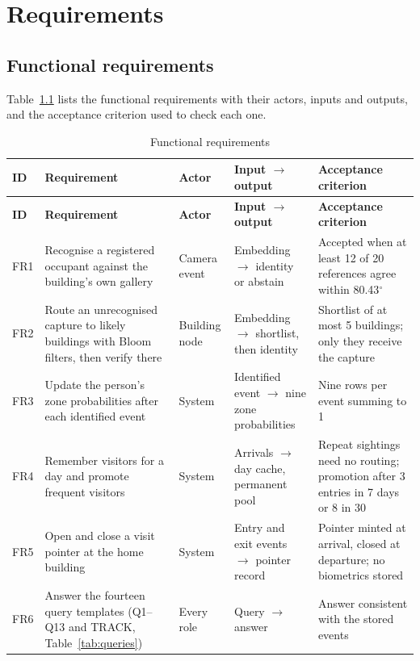 \documentclass[12pt,a4paper,oneside]{report}
\begin{document}
\clearpage
\chapter{Requirements}
\section{Functional requirements}
Table~\ref{tab:fr} lists the functional requirements with their actors, inputs and outputs, and the acceptance criterion used to check each one.

{\small\setlength{\tabcolsep}{4pt}\renewcommand{\arraystretch}{1.2}
\begin{longtable}{|p{0.93cm}|p{3.75cm}|p{1.87cm}|p{3.19cm}|p{3.94cm}|}
\caption{Functional requirements}\label{tab:fr}\\\hline
\textbf{ID} & \textbf{Requirement} & \textbf{Actor} & \textbf{Input $\rightarrow$ output} & \textbf{Acceptance criterion}\\\hline\endfirsthead
\hline\textbf{ID} & \textbf{Requirement} & \textbf{Actor} & \textbf{Input $\rightarrow$ output} & \textbf{Acceptance criterion}\\\hline\endhead
FR1 & Recognise a registered occupant against the building's own gallery & Camera event & Embedding $\rightarrow$ identity or abstain & Accepted when at least 12 of 20 references agree within 80.43$^{\circ}$\\\hline
FR2 & Route an unrecognised capture to likely buildings with Bloom filters, then verify there & Building node & Embedding $\rightarrow$ shortlist, then identity & Shortlist of at most 5 buildings; only they receive the capture\\\hline
FR3 & Update the person's zone probabilities after each identified event & System & Identified event $\rightarrow$ nine zone probabilities & Nine rows per event summing to 1\\\hline
FR4 & Remember visitors for a day and promote frequent visitors & System & Arrivals $\rightarrow$ day cache, permanent pool & Repeat sightings need no routing; promotion after 3 entries in 7 days or 8 in 30\\\hline
FR5 & Open and close a visit pointer at the home building & System & Entry and exit events $\rightarrow$ pointer record & Pointer minted at arrival, closed at departure; no biometrics stored\\\hline
FR6 & Answer the fourteen query templates (Q1--Q13 and TRACK, Table~\ref{tab:queries}) & Every role & Query $\rightarrow$ answer & Answer consistent with the stored events\\\hline

\end{longtable}}
\end{document}
